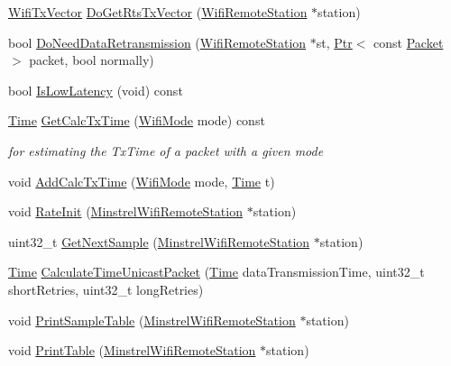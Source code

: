 \begin{DoxyCompactItemize}
\item 
\hyperlink{classns3_1_1WifiTxVector}{Wifi\+Tx\+Vector} \hyperlink{classns3_1_1MinstrelWifiManager_a8284c7164c9e5813a9f377ad120f4e18}{Do\+Get\+Rts\+Tx\+Vector} (\hyperlink{structns3_1_1WifiRemoteStation}{Wifi\+Remote\+Station} $\ast$station)
\item 
bool \hyperlink{classns3_1_1MinstrelWifiManager_ab321f4b099a4caf703b31e001671e36a}{Do\+Need\+Data\+Retransmission} (\hyperlink{structns3_1_1WifiRemoteStation}{Wifi\+Remote\+Station} $\ast$st, \hyperlink{classns3_1_1Ptr}{Ptr}$<$ const \hyperlink{classns3_1_1Packet}{Packet} $>$ packet, bool normally)
\item 
bool \hyperlink{classns3_1_1MinstrelWifiManager_a9df8c8eb858bb3e9eb223510e1861206}{Is\+Low\+Latency} (void) const 
\item 
\hyperlink{classns3_1_1Time}{Time} \hyperlink{classns3_1_1MinstrelWifiManager_a2d62faa20d151fd80b663fcefeaa63db}{Get\+Calc\+Tx\+Time} (\hyperlink{classns3_1_1WifiMode}{Wifi\+Mode} mode) const 
\begin{DoxyCompactList}\small\item\em for estimating the Tx\+Time of a packet with a given mode \end{DoxyCompactList}\item 
void \hyperlink{classns3_1_1MinstrelWifiManager_a3be874da8d33b476f55ec0f2db03e4d3}{Add\+Calc\+Tx\+Time} (\hyperlink{classns3_1_1WifiMode}{Wifi\+Mode} mode, \hyperlink{classns3_1_1Time}{Time} t)
\item 
void \hyperlink{classns3_1_1MinstrelWifiManager_a418f952e90b383f28fcf00f2bd816cb6}{Rate\+Init} (\hyperlink{structns3_1_1MinstrelWifiRemoteStation}{Minstrel\+Wifi\+Remote\+Station} $\ast$station)
\item 
uint32\+\_\+t \hyperlink{classns3_1_1MinstrelWifiManager_a9dd13d606ef45228fd9d69f5f1aec6cc}{Get\+Next\+Sample} (\hyperlink{structns3_1_1MinstrelWifiRemoteStation}{Minstrel\+Wifi\+Remote\+Station} $\ast$station)
\item 
\hyperlink{classns3_1_1Time}{Time} \hyperlink{classns3_1_1MinstrelWifiManager_ab619fbd9813b4672149eaa5b0a9e8298}{Calculate\+Time\+Unicast\+Packet} (\hyperlink{classns3_1_1Time}{Time} data\+Transmission\+Time, uint32\+\_\+t short\+Retries, uint32\+\_\+t long\+Retries)
\item 
void \hyperlink{classns3_1_1MinstrelWifiManager_a3d6d9c8bebe531a6437dd63fb25aea7b}{Print\+Sample\+Table} (\hyperlink{structns3_1_1MinstrelWifiRemoteStation}{Minstrel\+Wifi\+Remote\+Station} $\ast$station)
\item 
void \hyperlink{classns3_1_1MinstrelWifiManager_ae0f9ad3c56685b57053b76180924a619}{Print\+Table} (\hyperlink{structns3_1_1MinstrelWifiRemoteStation}{Minstrel\+Wifi\+Remote\+Station} $\ast$station)
\end{DoxyCompactItemize}
